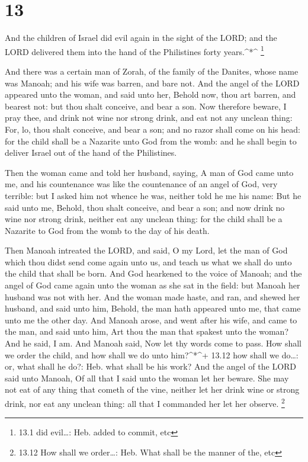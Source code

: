 \hypertarget{section-12}{%
\section{13}\label{section-12}}

 And the children of Israel did evil again in the sight of
the LORD; and the LORD delivered them into the hand of the Philistines
forty years.\^{}*\^{} \footnote{13.1 did evil\ldots: Heb. added to
  commit, etc}

 And there was a certain man of Zorah, of the family of the
Danites, whose name was Manoah; and his wife was barren, and bare not.
 And the angel of the LORD appeared unto the woman, and said
unto her, Behold now, thou art barren, and bearest not: but thou shalt
conceive, and bear a son.  Now therefore beware, I pray
thee, and drink not wine nor strong drink, and eat not any unclean
thing:  For, lo, thou shalt conceive, and bear a son; and no
razor shall come on his head: for the child shall be a Nazarite unto God
from the womb: and he shall begin to deliver Israel out of the hand of
the Philistines.

 Then the woman came and told her husband, saying, A man of
God came unto me, and his countenance was like the countenance of an
angel of God, very terrible: but I asked him not whence he was, neither
told he me his name:  But he said unto me, Behold, thou
shalt conceive, and bear a son; and now drink no wine nor strong drink,
neither eat any unclean thing: for the child shall be a Nazarite to God
from the womb to the day of his death.

 Then Manoah intreated the LORD, and said, O my Lord, let
the man of God which thou didst send come again unto us, and teach us
what we shall do unto the child that shall be born.  And God
hearkened to the voice of Manoah; and the angel of God came again unto
the woman as she sat in the field: but Manoah her husband was not with
her.  And the woman made haste, and ran, and shewed her
husband, and said unto him, Behold, the man hath appeared unto me, that
came unto me the other day.  And Manoah arose, and went
after his wife, and came to the man, and said unto him, Art thou the man
that spakest unto the woman? And he said, I am.  And Manoah
said, Now let thy words come to pass. How shall we order the child, and
how shall we do unto him?\^{}*\^{}+ 13.12 how shall we do\ldots: or,
what shall he do?: Heb. what shall be his work?  And the
angel of the LORD said unto Manoah, Of all that I said unto the woman
let her beware.  She may not eat of any thing that cometh
of the vine, neither let her drink wine or strong drink, nor eat any
unclean thing: all that I commanded her let her observe. \footnote{13.12
  How shall we order\ldots: Heb. What shall be the manner of the, etc}

